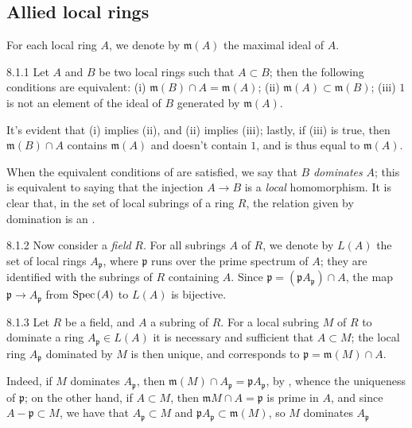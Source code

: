 \subsection{Allied local rings}
\label{1-schemes-8.1}

For each local ring $A$, we denote by $\mathfrak{m}(A)$ the maximal ideal of
$A$.

\begin{envs}[Lemma]{8.1.1}
\label{lem-1.8.1.1}
Let $A$ and $B$ be two local rings such that $A\subset B$;
then the following conditions are equivalent: (i)
$\mathfrak{m}(B)\cap A=\mathfrak{m}(A)$; (ii)
$\mathfrak{m}(A)\subset\mathfrak{m}(B)$; (iii) $1$ is not an element of
the ideal of $B$ generated by $\mathfrak{m}(A)$.
\end{envs}

It's evident that (i) implies (ii), and (ii) implies (iii); lastly, if (iii) is
true, then $\mathfrak{m}(B)\cap A$ contains $\mathfrak{m}(A)$ and doesn't
contain $1$, and is thus equal to $\mathfrak{m}(A)$.

When the equivalent conditions of  are satisfied, we say that $B$
\emph{dominates} $A$; this is equivalent to saying that the injection $A\to B$
is a \emph{local} homomorphism. It is clear that, in the set of local subrings
of a ring $R$, the relation given by domination is an .

\begin{env}{8.1.2}
\label{env-1.8.1.2}
Now consider a \emph{field} $R$. For all subrings $A$ of
$R$, we denote by $L(A)$ the set of local rings $A_\mathfrak{p}$, where
$\mathfrak{p}$ runs over the prime spectrum of $A$; they are identified with the
subrings of $R$ containing $A$. Since
$\mathfrak{p}=(\mathfrak{p}A_\mathfrak{p})\cap A$, the map $\mathfrak{p}\to A_\mathfrak{p}$
from ${\mathop{\mathrm{Spec}}\nolimits}\,(A)$ to $L(A)$ is bijective.
\end{env}

\begin{envs}[Lemma]{8.1.3}
\label{lem-1.8.1.3}
Let $R$ be a field, and $A$ a subring of $R$. For a
local subring $M$ of $R$ to dominate a ring $A_\mathfrak{p}\in L(A)$ it is
necessary and sufficient that $A\subset M$; the local ring $A_\mathfrak{p}$
dominated by $M$ is then unique, and corresponds to
$\mathfrak{p}=\mathfrak{m}(M)\cap A$.
\end{envs}

Indeed, if $M$ dominates $A_\mathfrak{p}$, then $\mathfrak{m}(M)\cap
A_\mathfrak{p}=\mathfrak{p}A_\mathfrak{p}$, by , whence the
uniqueness of $\mathfrak{p}$; on the other hand, if $A\subset M$, then
$\mathfrak{m}M\cap A=\mathfrak{p}$ is prime in $A$, and since
$A-\mathfrak{p}\subset M$, we have that $A_\mathfrak{p}\subset M$ and
$\mathfrak{p}A_\mathfrak{p}\subset\mathfrak{m}(M)$, so $M$ dominates
$A_\mathfrak{p}$

